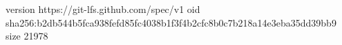 version https://git-lfs.github.com/spec/v1
oid sha256:b2db544b5fca938fefd85fc4038b1f3f4b2cfc8b0c7b218a14e3eba35dd39bb9
size 21978
